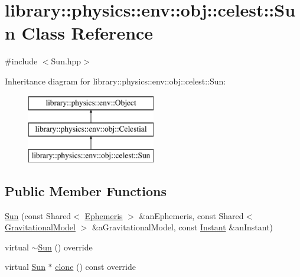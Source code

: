 \hypertarget{classlibrary_1_1physics_1_1env_1_1obj_1_1celest_1_1_sun}{}\section{library\+:\+:physics\+:\+:env\+:\+:obj\+:\+:celest\+:\+:Sun Class Reference}
\label{classlibrary_1_1physics_1_1env_1_1obj_1_1celest_1_1_sun}


{\ttfamily \#include $<$Sun.\+hpp$>$}

Inheritance diagram for library\+:\+:physics\+:\+:env\+:\+:obj\+:\+:celest\+:\+:Sun\+:\begin{figure}[H]
\begin{center}
\leavevmode
\includegraphics[height=3.000000cm]{classlibrary_1_1physics_1_1env_1_1obj_1_1celest_1_1_sun}
\end{center}
\end{figure}
\subsection*{Public Member Functions}
\begin{DoxyCompactItemize}
\item 
\hyperlink{classlibrary_1_1physics_1_1env_1_1obj_1_1celest_1_1_sun_ada5eefc36e00d3e68d60c94b85144388}{Sun} (const Shared$<$ \hyperlink{classlibrary_1_1physics_1_1env_1_1_ephemeris}{Ephemeris} $>$ \&an\+Ephemeris, const Shared$<$ \hyperlink{namespacelibrary_1_1physics_1_1env_1_1obj_1_1celest_ac63145c8cbe868bd79be8f6f423c8cf4}{Gravitational\+Model} $>$ \&a\+Gravitational\+Model, const \hyperlink{classlibrary_1_1physics_1_1time_1_1_instant}{Instant} \&an\+Instant)
\item 
virtual \hyperlink{classlibrary_1_1physics_1_1env_1_1obj_1_1celest_1_1_sun_a34a14e47bbbc26292809dba9c8d1ece8}{$\sim$\+Sun} () override
\item 
virtual \hyperlink{classlibrary_1_1physics_1_1env_1_1obj_1_1celest_1_1_sun}{Sun} $\ast$ \hyperlink{classlibrary_1_1physics_1_1env_1_1obj_1_1celest_1_1_sun_a79fa2d336dad399c3d933b0f5a2f9427}{clone} () const override
\end{DoxyCompactItemize}
